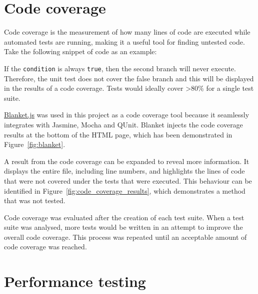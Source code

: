 % 	


\section{Code coverage} {
\label{sec:code_coverage}

	Code coverage is the measurement of how many lines of code are executed while automated tests are running, making it a useful tool for finding untested code. Take the following snippet of code as an example:

	

	If the \texttt{condition} is always \texttt{true}, then the second branch will never execute. Therefore, the unit test does not cover the false branch and this will be displayed in the results of a code coverage. Tests would ideally cover \textgreater80\% for a single test suite.

	\href{http://blanketjs.org/}{Blanket.js} was used in this project as a code coverage tool because it seamlessly integrates with Jasmine, Mocha and QUnit. Blanket injects the code coverage results at the bottom of the HTML page, which has been demonstrated in Figure~\ref{fig:blanket}.

	

	A result from the code coverage can be expanded to reveal more information. It displays the entire file, including line numbers, and highlights the lines of code that were not covered under the tests that were executed. This behaviour can be identified in Figure~\ref{fig:code_coverage_results}, which demonstrates a method that was not tested.

	

	Code coverage was evaluated after the creation of each test suite. When a test suite was analysed, more tests would be written in an attempt to improve the overall code coverage. This process was repeated until an acceptable amount of code coverage was reached.

}

\section{Performance testing} {
\label{sec:performance_testing}


}
